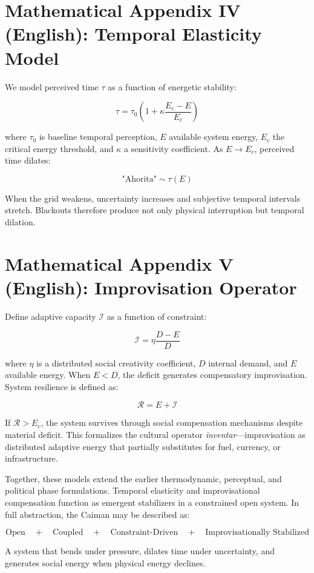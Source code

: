 \documentclass[12pt]{article}
\begin{document}
\section{Mathematical Appendix IV (English): Temporal Elasticity Model}

We model perceived time \( \tau \) as a function of energetic stability:

\[
\tau = \tau_0 \left(1 + \kappa \frac{E_c - E}{E_c}\right)
\]

where \( \tau_0 \) is baseline temporal perception, \( E \) available system energy, \( E_c \) the critical energy threshold, and \( \kappa \) a sensitivity coefficient. As \( E \to E_c \), perceived time dilates:

\[
\text{"Ahorita"} \sim \tau(E)
\]

When the grid weakens, uncertainty increases and subjective temporal intervals stretch. Blackouts therefore produce not only physical interruption but temporal dilation.

\section{Mathematical Appendix V (English): Improvisation Operator}

Define adaptive capacity \( \mathcal{I} \) as a function of constraint:

\[
\mathcal{I} = \eta \frac{D - E}{D}
\]

where \( \eta \) is a distributed social creativity coefficient, \( D \) internal demand, and \( E \) available energy. When \( E < D \), the deficit generates compensatory improvisation. System resilience is defined as:

\[
\mathcal{R} = E + \mathcal{I}
\]

If \( \mathcal{R} > E_c \), the system survives through social compensation mechanisms despite material deficit. This formalizes the cultural operator \textit{inventar}---improvisation as distributed adaptive energy that partially substitutes for fuel, currency, or infrastructure.

Together, these models extend the earlier thermodynamic, perceptual, and political phase formulations. Temporal elasticity and improvisational compensation function as emergent stabilizers in a constrained open system. In full abstraction, the Caiman may be described as:

\[
\text{Open} \quad + \quad \text{Coupled} \quad + \quad \text{Constraint-Driven} \quad + \quad \text{Improvisationally Stabilized}
\]

A system that bends under pressure, dilates time under uncertainty, and generates social energy when physical energy declines.
\end{document}
